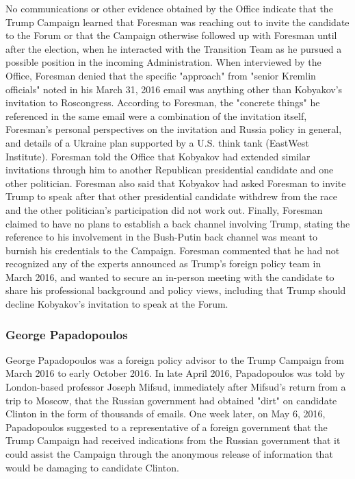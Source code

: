 No communications or other evidence obtained by the Office indicate that the Trump Campaign learned that Foresman was reaching out to invite the candidate to the Forum or that the Campaign otherwise followed up with Foresman until after the election, when he interacted with the Transition Team as he pursued a  possible position in the incoming Administration.%
When interviewed by the Office, Foresman denied that the specific "approach" from "senior Kremlin officials" noted in his March 31, 2016 email was anything other than Kobyakov's invitation to Roscongress.
According to Foresman, the "concrete things" he referenced in the same email were a combination of the invitation itself, Foresman's personal perspectives on the invitation and Russia policy in general, and details of a Ukraine plan supported by a U.S. think tank (EastWest Institute).
Foresman told the Office that Kobyakov had extended similar invitations through him to another Republican presidential candidate and one other politician.
Foresman also said that Kobyakov had asked Foresman to invite Trump to speak after that other presidential candidate withdrew from the race and the other politician's participation did not work out.%
Finally, Foresman claimed to have no plans to establish a back channel involving Trump, stating the reference to his involvement in the Bush-Putin back channel was meant to burnish his credentials to the Campaign.
Foresman commented that he had not recognized any of the experts announced as Trump's foreign policy team in March 2016, and wanted to secure an in-person meeting with the candidate to share his professional background and policy views, including that Trump should decline Kobyakov's invitation to speak at the Forum.%

\subsubsection{George Papadopoulos}

George Papadopoulos was a foreign policy advisor to the Trump Campaign from March 2016 to early October 2016.%
In late April 2016, Papadopoulos was told by London-based professor Joseph Mifsud, immediately after Mifsud's return from a trip to Moscow, that the Russian government had obtained "dirt" on candidate Clinton in the form of thousands of emails.
One week later, on May 6, 2016, Papadopoulos suggested to a representative of a foreign government that the Trump Campaign had received indications from the Russian government that it could assist the Campaign through the anonymous release of information that would be damaging to candidate Clinton.

